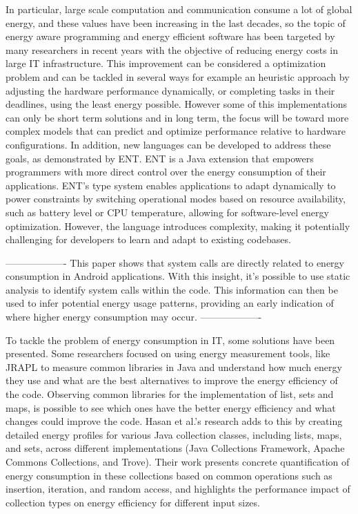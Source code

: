 \documentclass[sigplan]{acmart}
\begin{document}
In particular, large scale computation and communication consume a lot of global energy, and these values have been increasing in the last decades, so the topic of energy aware programming and energy efficient software has been targeted by many researchers in recent years with the objective of reducing energy costs in large IT infrastructure. This improvement can be considered a optimization problem and can be tackled in several ways for example an heuristic approach by adjusting the hardware performance dynamically, or completing tasks in their deadlines, using the least energy possible. However some of this implementations can only be short term solutions and in long term, the focus will be toward more complex models that can predict and optimize performance relative to hardware configurations\cite{10.1145/1666420.1666438}.
In addition, new languages can be developed to address these goals, as demonstrated by ENT\cite{10.1145/3062341.3062356}. ENT is a Java extension that empowers programmers with more direct control over the energy consumption of their applications. ENT’s type system enables applications to adapt dynamically to power constraints by switching operational modes based on resource availability, such as battery level or CPU temperature, allowing for software-level energy optimization. However, the language introduces complexity, making it potentially challenging for developers to learn and adapt to existing codebases. 


-------------------
This paper\cite{aggarwal2014power} shows that system calls are directly related to energy consumption in Android applications. With this insight, it's possible to use static analysis to identify system calls within the code. This information can then be used to infer potential energy usage patterns, providing an early indication of where higher energy consumption may occur.
-------------------


To tackle the problem of energy consumption in IT, some solutions have been presented. Some researchers focused on using energy measurement tools, like JRAPL to measure common libraries in Java and understand how much energy they use and what are the best alternatives to improve the energy efficiency of the code\cite{10.1145/2896967.2896968}. Observing common libraries for the implementation of list, sets and maps, is possible to see which ones have the better energy efficiency and what changes could improve the code.
Hasan et al.'s \cite{10.1145/2884781.2884869} research adds to this by creating detailed energy profiles for various Java collection classes, including lists, maps, and sets, across different implementations (Java Collections Framework, Apache Commons Collections, and Trove). Their work presents concrete quantification of energy consumption in these collections based on common operations such as insertion, iteration, and random access, and highlights the performance impact of collection types on energy efficiency for different input sizes.
\end{document}
